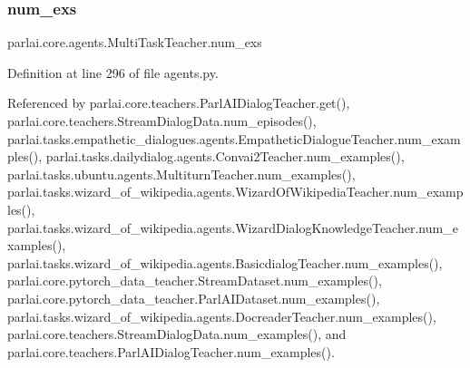 \mbox{\label{classparlai_1_1core_1_1agents_1_1MultiTaskTeacher_ac4287538dada130117c19347765ac654}} 
\subsubsection{\texorpdfstring{num\+\_\+exs}{num\_exs}}
{\footnotesize\ttfamily parlai.\+core.\+agents.\+Multi\+Task\+Teacher.\+num\+\_\+exs}



Definition at line 296 of file agents.\+py.



Referenced by parlai.\+core.\+teachers.\+Parl\+A\+I\+Dialog\+Teacher.\+get(), parlai.\+core.\+teachers.\+Stream\+Dialog\+Data.\+num\+\_\+episodes(), parlai.\+tasks.\+empathetic\+\_\+dialogues.\+agents.\+Empathetic\+Dialogue\+Teacher.\+num\+\_\+examples(), parlai.\+tasks.\+dailydialog.\+agents.\+Convai2\+Teacher.\+num\+\_\+examples(), parlai.\+tasks.\+ubuntu.\+agents.\+Multiturn\+Teacher.\+num\+\_\+examples(), parlai.\+tasks.\+wizard\+\_\+of\+\_\+wikipedia.\+agents.\+Wizard\+Of\+Wikipedia\+Teacher.\+num\+\_\+examples(), parlai.\+tasks.\+wizard\+\_\+of\+\_\+wikipedia.\+agents.\+Wizard\+Dialog\+Knowledge\+Teacher.\+num\+\_\+examples(), parlai.\+tasks.\+wizard\+\_\+of\+\_\+wikipedia.\+agents.\+Basicdialog\+Teacher.\+num\+\_\+examples(), parlai.\+core.\+pytorch\+\_\+data\+\_\+teacher.\+Stream\+Dataset.\+num\+\_\+examples(), parlai.\+core.\+pytorch\+\_\+data\+\_\+teacher.\+Parl\+A\+I\+Dataset.\+num\+\_\+examples(), parlai.\+tasks.\+wizard\+\_\+of\+\_\+wikipedia.\+agents.\+Docreader\+Teacher.\+num\+\_\+examples(), parlai.\+core.\+teachers.\+Stream\+Dialog\+Data.\+num\+\_\+examples(), and parlai.\+core.\+teachers.\+Parl\+A\+I\+Dialog\+Teacher.\+num\+\_\+examples().

\mbox{\label{classparlai_1_1core_1_1agents_1_1MultiTaskTeacher_a116b724be9c512d36f1d43cb9be86b78}} 

